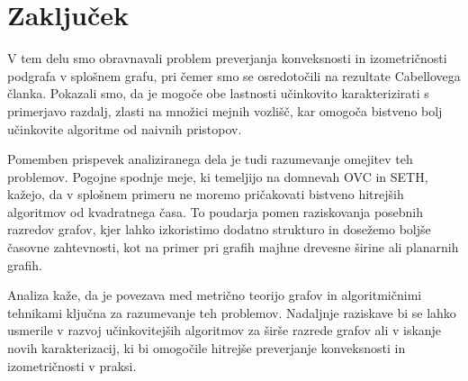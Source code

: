 \documentclass[sigconf
]{acmart}
\theoremstyle{definition}
\begin{document}
\section{Zaključek}
V tem delu smo obravnavali problem preverjanja konveksnosti in izometričnosti podgrafa v splošnem grafu, pri čemer smo se osredotočili na rezultate Cabellovega članka. Pokazali smo, da je mogoče obe lastnosti učinkovito karakterizirati s primerjavo razdalj, zlasti na množici mejnih vozlišč, kar omogoča bistveno bolj učinkovite algoritme od naivnih pristopov.

Pomemben prispevek analiziranega dela je tudi razumevanje omejitev teh problemov. Pogojne spodnje meje, ki temeljijo na domnevah OVC in SETH, kažejo, da v splošnem primeru ne moremo pričakovati bistveno hitrejših algoritmov od kvadratnega časa. To poudarja pomen raziskovanja posebnih razredov grafov, kjer lahko izkoristimo dodatno strukturo in dosežemo boljše časovne zahtevnosti, kot na primer pri grafih majhne drevesne širine ali planarnih grafih.

Analiza kaže, da je povezava med metrično teorijo grafov in algoritmičnimi tehnikami ključna za razumevanje teh problemov. Nadaljnje raziskave bi se lahko usmerile v razvoj učinkovitejših algoritmov za širše razrede grafov ali v iskanje novih karakterizacij, ki bi omogočile hitrejše preverjanje konveksnosti in izometričnosti v praksi.





\appendix
\end{document}
